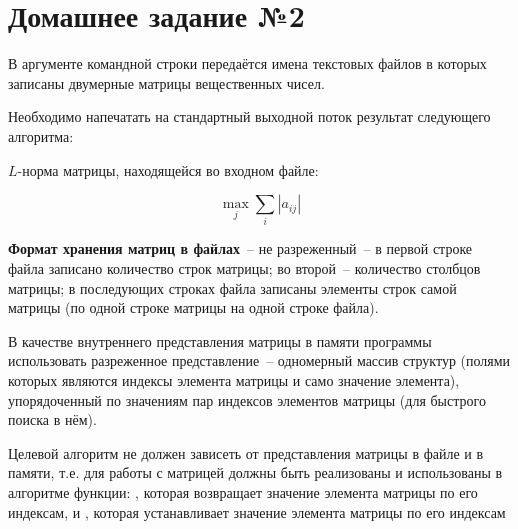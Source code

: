 \section*{Домашнее задание №2}

В аргументе командной строки передаётся имена текстовых файлов
в которых записаны двумерные матрицы
вещественных чисел.

Необходимо напечатать на стандартный выходной
поток результат следующего алгоритма:

$L$-норма матрицы, находящейся во входном файле:

$$
\max_j{\sum_i{|a_{ij}|}}
$$

\textbf{Формат хранения матриц в файлах}~--
не разреженный~-- в первой строке файла записано количество строк
матрицы; во второй~-- количество столбцов матрицы; в последующих
строках файла записаны элементы строк самой матрицы (по одной
строке матрицы на одной строке файла).

В качестве внутреннего представления матрицы в памяти программы
использовать разреженное представление~-- одномерный массив структур (полями
которых являются индексы элемента матрицы и само значение
элемента), упорядоченный по значениям пар индексов элементов
матрицы (для быстрого поиска в нём).

Целевой алгоритм не
должен зависеть от представления матрицы в файле и в памяти, т.е. для
работы с матрицей должны быть реализованы и использованы в алгоритме
функции: , которая возвращает
значение элемента матрицы по его индексам, и , которая устанавливает значение элемента
матрицы по его индексам
